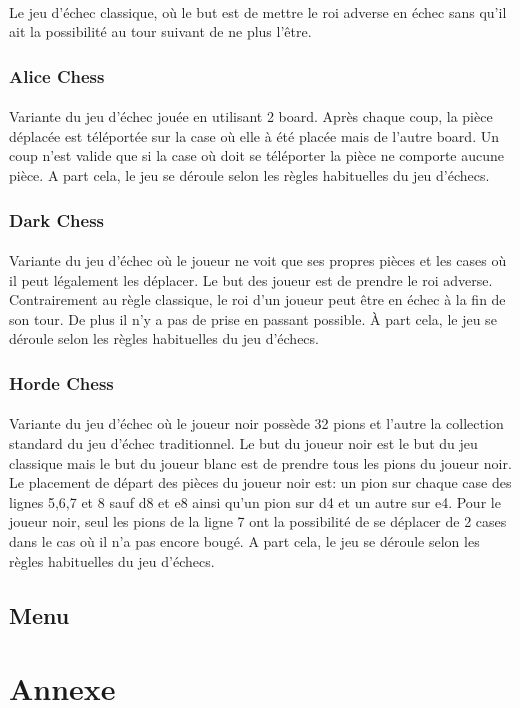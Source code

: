 \documentclass[10pt, a4paper]{article}
\begin{document}
\paragraph{}Le jeu d'échec classique, où le but est de mettre le roi adverse en échec sans qu'il ait la possibilité au tour suivant de ne plus l'être.
\subsubsection{Alice Chess}
\paragraph{}Variante du jeu d'échec jouée en utilisant 2 board. Après chaque coup, la pièce déplacée est téléportée sur la case où elle à été placée mais de l'autre board. Un coup n'est valide que si la case où doit se téléporter la pièce ne comporte aucune pièce. A part cela, le jeu se déroule selon les règles habituelles du jeu d'échecs.
\subsubsection{Dark Chess}
\paragraph{}Variante du jeu d'échec où le joueur ne voit que ses propres pièces et les cases où il peut légalement les déplacer. Le but des joueur est de prendre le roi adverse. Contrairement au règle classique, le roi d'un joueur peut être en échec à la fin de son tour. De plus il n'y a pas de prise en passant possible. À part cela, le jeu se déroule selon les règles habituelles du jeu d'échecs.

\subsubsection{Horde Chess}
\paragraph{} Variante du jeu d'échec où le joueur noir possède 32 pions et l'autre la collection standard du jeu d'échec traditionnel. Le but du joueur noir est le but du jeu classique mais le but du joueur blanc est de prendre tous les pions du joueur noir. Le placement de départ des pièces du joueur noir est: un pion sur chaque case des lignes 5,6,7 et 8 sauf d8 et e8 ainsi qu'un pion sur d4 et un autre sur e4. Pour le joueur noir, seul les pions de la ligne 7 ont la possibilité de se déplacer de 2 cases dans le cas où il n'a pas encore bougé. A part cela, le jeu se déroule selon les règles habituelles du jeu d'échecs.
		
\subsection{Menu}
		
\section{Annexe}
	
	
		
		
		
		
\end{document}
